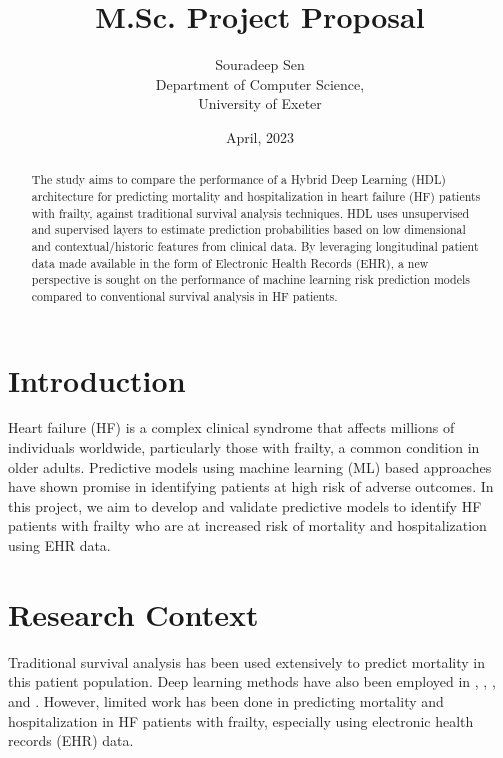 \documentclass[%
 reprint,
 amsmath,amssymb,
 aps,
 nofootinbib,
]{revtex4-2}
\theoremstyle{definition}
\begin{document}

\title{M.Sc. Project Proposal}%
\author{Souradeep Sen \\
	 \small Department of Computer Science, \\ 
	 \small University of Exeter
	}

\date{April, 2023}%

\begin{abstract}
The study aims to compare the performance of a Hybrid Deep Learning (HDL) architecture for predicting mortality and hospitalization in heart failure (HF) patients with frailty, against traditional survival analysis techniques. HDL uses unsupervised and supervised layers to estimate prediction probabilities based on low dimensional and contextual/historic features from clinical data. By leveraging longitudinal patient data made available in the form of Electronic Health Records (EHR), a new perspective is sought on the performance of machine learning risk prediction models compared to conventional survival analysis in HF patients.
\end{abstract}

\maketitle

\section{\label{intro}Introduction}
Heart failure (HF) is a complex clinical syndrome that affects millions of individuals worldwide, particularly those with frailty, a common condition in older adults. Predictive models using machine learning (ML) based approaches have shown promise in identifying patients at high risk of adverse outcomes. In this project, we aim to develop and validate predictive models to identify HF patients with frailty who are at increased risk of mortality and hospitalization using EHR data. 

\section{\label{rescon}Research Context}
Traditional survival analysis has been used extensively to predict mortality in this patient population. Deep learning methods have also been employed in \citep{e2edlgjoreski}, \citep{nirschl2018deep}, \citep{10.1001/jamanetworkopen.2019.6972}, \citep{asolares2020} and \citep{lorenzoni_2019}. However, limited work has been done in predicting mortality and hospitalization in HF patients with frailty, especially using electronic health records (EHR) data.
\end{document}
